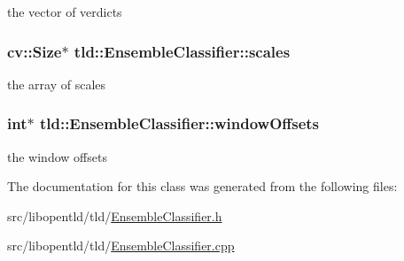 the vector of verdicts 

\hypertarget{classtld_1_1EnsembleClassifier_ae2ea00a933d9c96498ba756a2b4ec6b5}{
\subsubsection[{scales}]{\setlength{\rightskip}{0pt plus 5cm}cv\-::\-Size$\ast$ tld\-::\-Ensemble\-Classifier\-::scales}}\label{classtld_1_1EnsembleClassifier_ae2ea00a933d9c96498ba756a2b4ec6b5}


the array of scales 

\hypertarget{classtld_1_1EnsembleClassifier_abc6ed3b991a724b07dfcc25108769e92}{
\subsubsection[{window\-Offsets}]{\setlength{\rightskip}{0pt plus 5cm}int$\ast$ tld\-::\-Ensemble\-Classifier\-::window\-Offsets}}\label{classtld_1_1EnsembleClassifier_abc6ed3b991a724b07dfcc25108769e92}


the window offsets 



The documentation for this class was generated from the following files\-:\begin{DoxyCompactItemize}
\item 
src/libopentld/tld/\hyperlink{EnsembleClassifier_8h}{Ensemble\-Classifier.\-h}\item 
src/libopentld/tld/\hyperlink{EnsembleClassifier_8cpp}{Ensemble\-Classifier.\-cpp}\end{DoxyCompactItemize}
